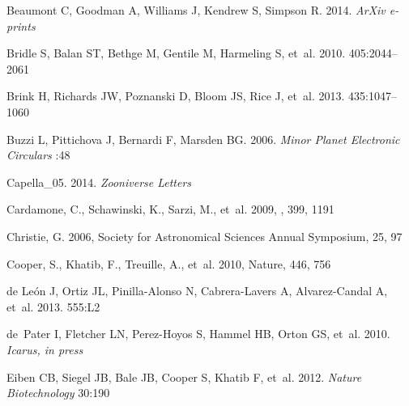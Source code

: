 \documentclass{ar2e}
\begin{document}
\begin{thebibliography}{}
{Beaumont} C, {Goodman} A, {Williams} J, {Kendrew} S, {Simpson} R. 2014.
\newblock \textit{ArXiv e-prints}

{Bridle} S, {Balan} ST, {Bethge} M, {Gentile} M, {Harmeling} S, et~al. 2010.
\newblock \textit{\mnras} 405:2044--2061

{Brink} H, {Richards} JW, {Poznanski} D, {Bloom} JS, {Rice} J, et~al. 2013.
\newblock \textit{\mnras} 435:1047--1060

{Buzzi} L, {Pittichova} J, {Bernardi} F, {Marsden} BG. 2006.
\newblock \textit{Minor Planet Electronic Circulars} :48

{Capella\_05}. 2014.
\newblock \textit{Zooniverse Letters}

{Cardamone}, C., {Schawinski}, K., {Sarzi}, M., {et~al.} 2009, \mnras, 399,
  1191

{Christie}, G. 2006, Society for Astronomical Sciences Annual Symposium, 25, 97

{Cooper}, S., {Khatib}, F., {Treuille}, A., {et~al.} 2010, {Nature}, 446, 756

{de Le{\'o}n} J, {Ortiz} JL, {Pinilla-Alonso} N, {Cabrera-Lavers} A,
  {Alvarez-Candal} A, et~al. 2013.
\newblock \textit{\aap} 555:L2

de~Pater I, Fletcher LN, Perez-Hoyos S, Hammel HB, Orton GS, et~al. 2010.
\newblock \textit{Icarus, in press}

{Eiben} CB, {Siegel} JB, {Bale} JB, {Cooper} S, {Khatib} F, et~al. 2012.
\newblock \textit{{Nature Biotechnology}} 30:190


\end{thebibliography}
\end{document}
